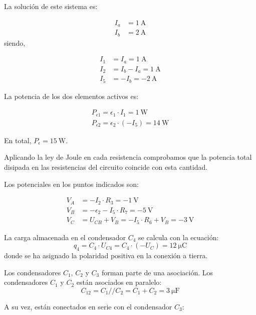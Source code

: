 \documentclass[10pt]{article}
\begin{document}
La solución de este sistema es:

\begin{align*}
  I_a &= \SI{1}{\ampere}\\
  I_b &= \SI{2}{\ampere}
\end{align*}
siendo,

\begin{align*}
  I_1 &= I_a = \SI{1}{\ampere}\\
  I_2 &= I_b - I_a = \SI{1}{\ampere}\\
  I_5 &= -I_b = \SI{-2}{\ampere}
\end{align*}

La potencia de los dos elementos activos es:

\begin{align*}
  P_{\epsilon1} = \epsilon_1 \cdot I_1 = \SI{1}{\watt}\\
  P_{\epsilon2} = \epsilon_2 \cdot (-I_5) = \SI{14}{\watt}
\end{align*}

En total, $P_\epsilon = \SI{15}{\watt}$.

Aplicando la ley de Joule en cada resistencia comprobamos que la potencia total disipada en las resistencias del circuito coincide con esta cantidad.

Los potenciales en los puntos indicados son:

\begin{align*}
  V_A &= -I_2 \cdot R_3 = \SI{-1}{\volt}\\
  V_B &= -\epsilon_2 - I_5 \cdot R_7 = \SI{-5}{\volt}\\
  V_C &= U_{CB} + V_B = -I_5 \cdot R_6 + V_B = \SI{-3}{\volt}
\end{align*}

La carga almacenada en el condensador $C_4$ se calcula con la ecuación:
\begin{equation*}
  q_4 = C_4 \cdot U_{C4} = C_4 \cdot (-U_C) = \SI{12}{\micro\coulomb}
\end{equation*}
donde se ha asignado la polaridad positiva en la conexión a tierra.

Los condensadores $C_1$, $C_2$ y $C_3$ forman parte de una asociación. Los condensadores $C_1$ y $C_2$ están asociados en paralelo:
\begin{equation*}
  C_{12} = C_1//C_2 = C_1 + C_2 = \SI{3}{\micro\farad}
\end{equation*}

A su vez, están conectados en serie con el condensador $C_3$:
\end{document}
